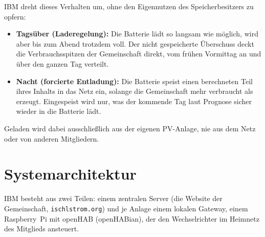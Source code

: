 \documentclass[11pt,a4paper]{article}
\newcommand{\code}[1]{\texttt{#1}}
\begin{document}
IBM dreht dieses Verhalten um, ohne den Eigennutzen des Speicherbesitzers zu
opfern:

\begin{itemize}
  \item \textbf{Tagsüber (Laderegelung):} Die Batterie lädt so langsam wie
    möglich, wird aber bis zum Abend trotzdem voll. Der nicht gespeicherte
    Überschuss deckt die Verbrauchsspitzen der Gemeinschaft direkt, vom
    frühen Vormittag an und über den ganzen Tag verteilt.
  \item \textbf{Nacht (forcierte Entladung):} Die Batterie speist einen
    berechneten Teil ihres Inhalts in das Netz ein, solange die Gemeinschaft
    mehr verbraucht als erzeugt. Eingespeist wird nur, was der kommende Tag
    laut Prognose sicher wieder in die Batterie lädt.
\end{itemize}

Geladen wird dabei ausschließlich aus der eigenen PV-Anlage, nie aus dem
Netz oder von anderen Mitgliedern.

\section{Systemarchitektur}

IBM besteht aus zwei Teilen: einem zentralen Server (die Website der
Gemeinschaft, \code{ischlstrom.org}) und je Anlage einem lokalen Gateway,
einem Raspberry~Pi mit openHAB (openHABian), der den Wechselrichter im
Heimnetz des Mitglieds ansteuert.
\end{document}
